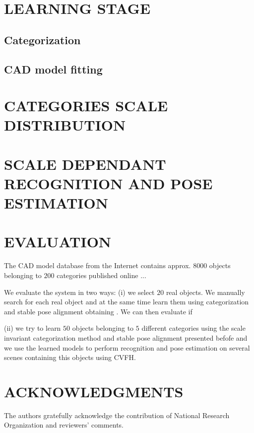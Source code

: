 \documentclass[a4paper, 10pt, conference]{ieeeconf}      %
\begin{document}
\twocolumn

\section{LEARNING STAGE}

\subsection{Categorization}

\subsection{CAD model fitting}

\section{CATEGORIES SCALE DISTRIBUTION}

\section{SCALE DEPENDANT RECOGNITION AND POSE ESTIMATION}

\section{EVALUATION}

The CAD model database from the Internet contains approx. $8000$ objects belonging
to $200$ categories published online ...

We evaluate the system in two ways: (i) we select $20$ real objects. We manually search for each real object  and at the same time learn them using categorization and stable pose
alignment obtaining . We can then evaluate if 

(ii) we try to learn $50$ objects
belonging to $5$ different categories using the scale invariant categorization
method and stable pose alignment presented befofe and we use the learned models
to perform recognition and pose estimation on several scenes containing this objects using CVFH.

\section{ACKNOWLEDGMENTS}

The authors gratefully acknowledge the contribution of National Research Organization and reviewers' comments.
\end{document}
